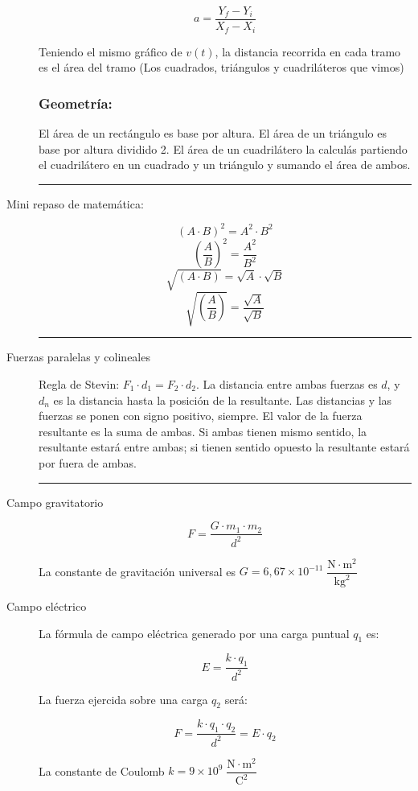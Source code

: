 \begin{description}
    \[a=\dfrac{Y_f - Y_i}{X_f - X_i}\]
    
    Teniendo el mismo gráfico de $v(t)$, la distancia recorrida en cada tramo es el área del tramo (Los cuadrados, triángulos y cuadriláteros que vimos)
    
    \subsubsection*{Geometría:}
    
    El área de un rectángulo es base por altura. El área de un triángulo es base por altura dividido 2. El área de un cuadrilátero la calculás partiendo el cuadrilátero en un cuadrado y un triángulo y sumando el área de ambos.
    \vspace{0.5cm}

    \hrule

    \item[Mini repaso de matemática:]
    
    $$(A\cdot B)^2 = A^2 \cdot B^2$$
    $$\left(\frac{A}{B}\right)^2 = \frac{A^2}{B^2}$$
    $$\sqrt{(A\cdot B)} = \sqrt{A} \cdot \sqrt{B}$$
    $$\sqrt{\left(\frac{A}{B}\right)} = \frac{\sqrt{A}}{\sqrt{B}}$$

    \hrule

    \item[Fuerzas paralelas y colineales]\hfil

    Regla de Stevin: $F_1 \cdot d_1 = F_2 \cdot d_2$. La distancia entre ambas fuerzas es $d$, y $d_n$ es la distancia hasta la posición de la resultante. Las distancias y las fuerzas se ponen con signo positivo, siempre. El valor de la fuerza resultante es la suma de ambas. Si ambas tienen mismo sentido, la resultante estará entre ambas; si tienen sentido opuesto la resultante estará por fuera de ambas.

\skipline
\hrule
\skipline

\item[Campo gravitatorio]\hfil
$$F = \dfrac{G\cdot m_1 \cdot m_2}{d^2}$$

La constante de gravitación universal es $G = 6,67\times 10^{-11}\;\dfrac{\text{N}\cdot \text{m}^2}{\text{kg}^2}$

\item[Campo eléctrico]\hfil

La fórmula de campo eléctrica generado por una carga puntual $q_1$ es:

$$E = \dfrac{k \cdot q_1}{d^2}$$

La fuerza ejercida sobre una carga $q_2$ será:

$$F = \dfrac{k\cdot q_1 \cdot q_2}{d^2} = E \cdot q_2$$ 

La constante de Coulomb $k = 9\times 10^{9}\;\dfrac{\text{N}\cdot \text{m}^2}{\text{C}^2}$

\end{description}

